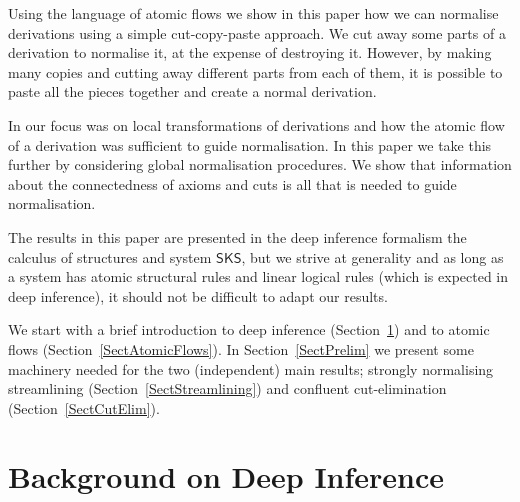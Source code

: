 \documentclass[a4paper]{amsart}
\theoremstyle{remark}
\theoremstyle{definition}
\begin{document}
Using the language of atomic flows we show in this paper how we can normalise derivations using a simple cut-copy-paste approach. We cut away some parts of a derivation to normalise it, at the expense of destroying it. However, by making many copies and cutting away different parts from each of them, it is possible to paste all the pieces together and create a normal derivation.

In \cite{GuglGund:07:Normalis:lr} our focus was on local transformations of derivations and how the atomic flow of a derivation was sufficient to guide normalisation. In this paper we take this further by considering global normalisation procedures. We show that information about the connectedness of axioms and cuts is all that is needed to guide normalisation.


\newcommand{\SKS}{\mathsf{SKS}}
The results in this paper are presented in the deep inference formalism the calculus of structures and system $\SKS$, but we strive at generality and as long as a system has atomic structural rules and linear logical rules (which is expected in deep inference), it should not be difficult to adapt our results.

We start with a brief introduction to deep inference (Section~\ref{SectDeepInference}) and to atomic flows (Section~\ref{SectAtomicFlows}). In Section~\ref{SectPrelim} we present some machinery needed for the two (independent) main results; strongly normalising streamlining (Section~\ref{SectStreamlining}) and confluent cut-elimination (Section~\ref{SectCutElim}).

\section{Background on Deep Inference}\label{SectDeepInference}

\newcommand{\fff}{\mathsf f}
\newcommand{\ttt}{\mathsf t}
\newcommand{\ot}{\mathbin\shortleftarrow}

\end{document}
